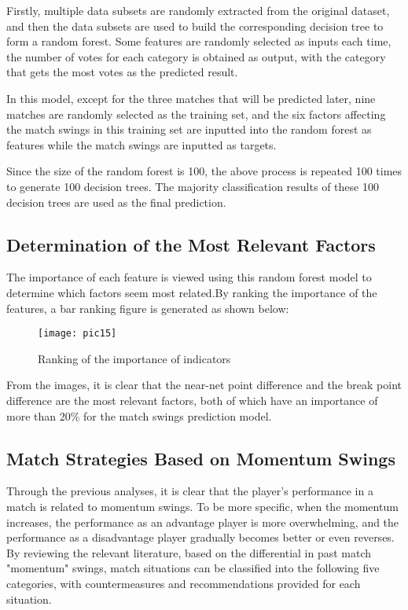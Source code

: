 \documentclass[12pt]{article}  %
\begin{document}
Firstly, multiple data subsets are randomly extracted from the original dataset, and then the data subsets are used to build the corresponding decision tree to form a random forest. Some features are randomly selected as inputs each time, the number of votes for each category is obtained as output, with the category that gets the most votes as the predicted result.

In this model, except for the three matches that will be predicted later, nine matches are randomly selected as the training set, and the six factors affecting the match swings in this training set are inputted into the random forest as features while the match swings are inputted as targets.

Since the size of the random forest is 100, the above process is repeated 100 times to generate 100 decision trees. The majority classification results of these 100 decision trees are used as the final prediction.


\subsection{Determination of the Most Relevant Factors}
The importance of each feature is viewed using this random forest model to determine which factors seem most related.By ranking the importance of the features, a bar ranking figure is generated as shown below:

\begin{figure}[htbp]  %
	\centering  %
	\texttt{[image: pic15]} %
	\caption{Ranking of the importance of indicators}  
	\label{pic15}
\end{figure}

From the images, it is clear that the near-net point difference and the break point difference are the most relevant factors, both of which have an importance of more than 20\% for the match swings prediction model.

\subsection{Match Strategies Based on Momentum Swings}
Through the previous analyses, it is clear that the player's performance in a match is related to momentum swings. To be more specific, when the momentum increases, the performance as an advantage player is more overwhelming, and the performance as a disadvantage player gradually becomes better or even reverses. By reviewing the relevant literature, based on the differential in past match "momentum" swings, match situations can be classified into the following five categories, with countermeasures and recommendations provided for each situation.
\end{document}

